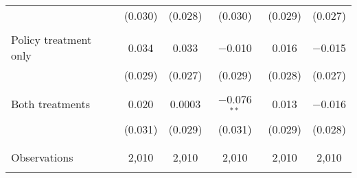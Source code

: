 \begin{tabular}{@{\extracolsep{5pt}}lccccc}
  & (0.030) & (0.028) & (0.030) & (0.029) & (0.027) \\ 
  & & & & & \\ 
 Policy treatment only & 0.034 & 0.033 & $-$0.010 & 0.016 & $-$0.015 \\ 
  & (0.029) & (0.027) & (0.029) & (0.028) & (0.027) \\ 
  & & & & & \\ 
 Both treatments & 0.020 & 0.0003 & $-$0.076$^{**}$ & 0.013 & $-$0.016 \\ 
  & (0.031) & (0.029) & (0.031) & (0.029) & (0.028) \\ 
  & & & & & \\ 
\hline \\[-1.8ex] 

Observations & 2,010 & 2,010 & 2,010 & 2,010 & 2,010 \\ 
\hline 
\hline \\[-1.8ex] 
\end{tabular} 